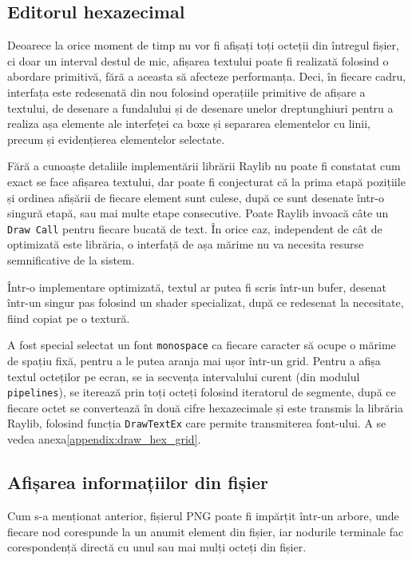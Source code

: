 \documentclass[a4paper,12pt]{report}
\begin{document}
\subsection{Editorul hexazecimal}

Deoarece la orice moment de timp nu vor fi afișați toți octeții din întregul fișier,
ci doar un interval destul de mic, afișarea textului poate fi realizată folosind o abordare primitivă,
fără a aceasta să afecteze performanța.
Deci, în fiecare cadru, interfața este redesenată din nou folosind operațiile primitive
de afișare a textului, de desenare a fundalului și de desenare unelor dreptunghiuri
pentru a realiza așa elemente ale interfeței ca boxe și separarea elementelor cu linii,
precum și evidențierea elementelor selectate.

Fără a cunoaște detaliile implementării librării Raylib nu poate fi constatat cum exact se face afișarea textului,
dar poate fi conjecturat că la prima etapă pozițiile și ordinea afișării de fiecare element sunt culese,
după ce sunt desenate într-o singură etapă, sau mai multe etape consecutive.
Poate Raylib invoacă câte un \texttt{Draw Call} pentru fiecare bucată de text.
În orice caz, independent de cât de optimizată este librăria,
o interfață de așa mărime nu va necesita resurse semnificative de la sistem.

Într-o implementare optimizată, textul ar putea fi scris într-un bufer,
desenat într-un singur pas folosind un shader specializat,
după ce redesenat la necesitate, fiind copiat pe o textură.

A fost special selectat un font \texttt{monospace} ca fiecare caracter să ocupe o mărime de spațiu fixă,
pentru a le putea aranja mai ușor într-un grid.
Pentru a afișa textul octeților pe ecran, se ia secvența intervalului curent (din modulul \texttt{pipelines}),
se iterează prin toți octeți folosind iteratorul de segmente,
după ce fiecare octet se convertează în două cifre hexazecimale și este transmis la librăria Raylib,
folosind funcția \texttt{DrawTextEx} care permite transmiterea font-ului.
A se vedea anexa\ref{appendix:draw_hex_grid}.

\subsection{Afișarea informațiilor din fișier}

Cum s-a menționat anterior, fișierul \ac{PNG} poate fi impărțit într-un arbore,
unde fiecare nod corespunde la un anumit element din fișier,
iar nodurile terminale fac corespondență directă cu unul sau mai mulți octeți din fișier.
\end{document}

